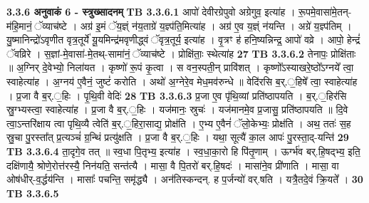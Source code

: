 \documentclass[17pt]{extarticle}
\begin{document}
{{{{{{{{{{{{{{{{{{{                \textbf{ 3.3.6     अनुवाकं   6 - स्त्रुख्सादनम्} \newline
                                \textbf{ TB 3.3.6.1} \newline
                  आपो॑ देवीरग्रेपुवो अग्रेगुव॒ इत्या॑ह । रू॒पमे॒वासा॑मे॒तन्-म॑हि॒मानं॒ ॅव्याच॑ष्टे । अग्र॑ इ॒मं ॅय॒ज्ञ्ं न॑य॒ताग्रे॑ य॒ज्ञ्प॑ति॒मित्या॑ह । अग्र॑ ए॒व य॒ज्ञ्ं न॑यन्ति । अग्रे॑ य॒ज्ञ्प॑तिम् । यु॒ष्मानिन्द्रो॑ऽवृणीत वृत्र॒तूर्ये॑ यू॒यमिन्द्र॑मवृणीद्ध्वं ॅवृत्र॒तूर्य॒ इत्या॑ह । वृ॒त्रꣳ ह॑ हनि॒ष्यन्निन्द्र॒ आपो॑ वव्रे । आपो॒ हेन्द्रं॑ ॅवव्रिरे । स॒ज्ञां-मे॒वासा॑-मे॒तथ्-सामा॑नं॒ ॅव्याच॑ष्टे । प्रोक्षि॑ताः॒ स्थेत्या॑ह \textbf{ 27} \newline
                  \newline
                                \textbf{ TB 3.3.6.2} \newline
                  तेनापः॒ प्रोक्षि॑ताः ॥ अ॒ग्निर् दे॒वेभ्यो॒ निला॑यत । कृष्णो॑ रू॒पं कृ॒त्वा । स वन॒स्पती॒न् प्रावि॑शत् । कृष्णो᳚ऽस्याखरे॒ष्ठो᳚ऽग्नये᳚ त्वा॒ स्वाहेत्या॑ह । अ॒ग्नय॑ ए॒वैनं॒ जुष्टं॑ करोति । अथो॑ अ॒ग्नेरे॒व मेध॒मव॑रुन्धे ॥ वेदि॑रसि ब॒र्.॒हिषे᳚ त्वा॒ स्वाहेत्या॑ह । प्र॒जा वै ब॒र्.॒हिः । पृ॒थि॒वी वेदिः॑ \textbf{ 28} \newline
                  \newline
                                \textbf{ TB 3.3.6.3} \newline
                  प्र॒जा ए॒व पृ॑थि॒व्यां प्रति॑ष्ठापयति । ब॒र्.॒हिर॑सि स्रु॒ग्भ्यस्त्वा॒ स्वाहेत्या॑ह । प्र॒जा वै ब॒र्.॒हिः । यज॑मानः॒ स्रुचः॑ । यज॑मानमे॒व प्र॒जासु॒ प्रति॑ष्ठापयति ॥ दि॒वे त्वा॒ऽन्तरि॑क्षाय त्वा पृथि॒व्यै त्वेति॑ ब॒र्.॒हिरा॒साद्य॒ प्रोक्ष॑ति । ए॒भ्य ए॒वैनं॑ ॅलो॒केभ्यः॒ प्रोक्ष॑ति । अथ॒ ततः॑ स॒ह स्रु॒चा पु॒रस्ता᳚त् प्र॒त्यञ्चं॑ ग्र॒न्थिं प्रत्यु॑क्षति । प्र॒जा वै ब॒र्.॒हिः । यथा॒ सूत्यै॑ का॒ल आपः॑ पु॒रस्ता॒द्-यन्ति॑ \textbf{ 29} \newline
                  \newline
                                \textbf{ TB 3.3.6.4} \newline
                  ता॒दृगे॒व तत् ॥ स्व॒धा पि॒तृभ्य॒ इत्या॑ह । स्व॒धा॒का॒रो हि पि॑तृ॒णाम् । ऊर्ग्भ॑व बर्.हि॒षद्भ्य॒ इति॒ दक्षि॑णायै॒ श्रोणे॒रोत्त॑रस्यै॒ निन॑यति॒ सन्त॑त्यै । मासा॒ वै पि॒तरो॑ बर्.हि॒षदः॑ । मासा॑ने॒व प्री॑णाति । मासा॒ वा ओष॑धीर्-व॒र्द्धय॑न्ति । मासाः᳚ पचन्ति॒ समृ॑द्ध्यै । अन॑तिस्कन्दन्. ह प॒र्जन्यो॑ वर्.षति । यत्रै॒तदे॒वं क्रि॒यते᳚ । \textbf{ 30} \newline
                  \newline
                                \textbf{ TB 3.3.6.5} \newline
}}}}}}}}}}}}}}}}}}}
\end{document}
